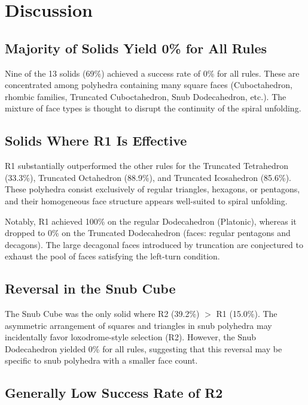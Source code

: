 \documentclass[a4paper,11pt]{article}
\begin{document}
\section{Discussion}

\subsection{Majority of Solids Yield 0\% for All Rules}

Nine of the 13 solids (69\%) achieved a success rate of 0\% for all rules.
These are concentrated among polyhedra containing many square faces
(Cuboctahedron, rhombic families, Truncated Cuboctahedron, Snub Dodecahedron, etc.).
The mixture of face types is thought to disrupt the continuity of the spiral unfolding.

\subsection{Solids Where R1 Is Effective}

R1 substantially outperformed the other rules for the Truncated Tetrahedron (33.3\%),
Truncated Octahedron (88.9\%), and Truncated Icosahedron (85.6\%).
These polyhedra consist exclusively of regular triangles, hexagons, or pentagons,
and their homogeneous face structure appears well-suited to spiral unfolding.

Notably, R1 achieved 100\% on the regular Dodecahedron (Platonic),
whereas it dropped to 0\% on the Truncated Dodecahedron (faces: regular pentagons and decagons).
The large decagonal faces introduced by truncation are conjectured to exhaust the pool of
faces satisfying the left-turn condition.

\subsection{Reversal in the Snub Cube}

The Snub Cube was the only solid where R2 (39.2\%) $>$ R1 (15.0\%).
The asymmetric arrangement of squares and triangles in snub polyhedra may incidentally
favor loxodrome-style selection (R2).
However, the Snub Dodecahedron yielded 0\% for all rules,
suggesting that this reversal may be specific to snub polyhedra with a smaller face count.

\subsection{Generally Low Success Rate of R2}
\end{document}
